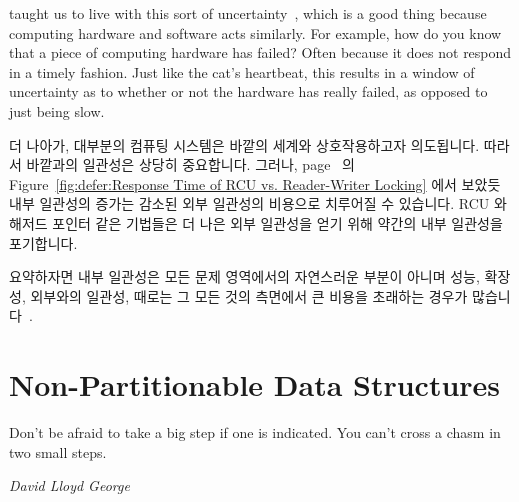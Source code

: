 taught us to live with this sort of
uncertainty~\cite{WeinerHeisenberg1927Uncertain}, which is a good
thing because computing hardware and software acts similarly.
For example, how do you know that a piece of computing hardware
has failed?
Often because it does not respond in a timely fashion.
Just like the cat's heartbeat, this results in a window of
uncertainty as to whether or not the hardware has really failed,
as opposed to just being slow.

\fi

더 나아가, 대부분의 컴퓨팅 시스템은 바깥의 세계와 상호작용하고자 의도됩니다.
따라서 바깥과의 일관성은 상당히 중요합니다.
그러나,
page~\pageref{fig:defer:Response Time of RCU vs. Reader-Writer Locking} 의
Figure~\ref{fig:defer:Response Time of RCU vs. Reader-Writer Locking}
에서 보았듯 내부 일관성의 증가는 감소된 외부 일관성의 비용으로 치루어질 수
있습니다.
RCU 와 해저드 포인터 같은 기법들은 더 나은 외부 일관성을 얻기 위해 약간의 내부
일관성을 포기합니다.

요약하자면 내부 일관성은 모든 문제 영역에서의 자연스러운 부분이 아니며 성능,
확장성, 외부와의 일관성, 때로는 그 모든 것의 측면에서 큰 비용을 초래하는 경우가
많습니다~\cite{AndreasHaas2012FIFOisnt,AndreasHaas2013CFRelaxedQueues,10.5555/3241639.3241645}.

\section{Non-Partitionable Data Structures}
\label{sec:datastruct:Non-Partitionable Data Structures}
%
\epigraph{Don't be afraid to take a big step if one is indicated.
	  You can't cross a chasm in two small steps.}
	 {\emph{David Lloyd George}}

